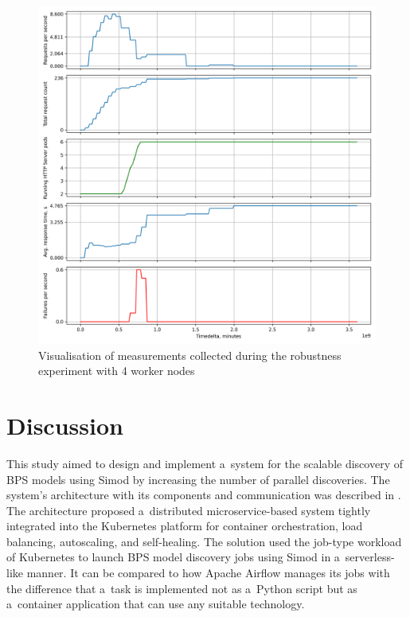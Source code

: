 \documentclass[12pt]{article}
\begin{document}
\begin{figure}[p]
    \centering
    \includegraphics[width=\textwidth]{figures/robustness_4_nodes.png}
    \caption{Visualisation of measurements collected during the robustness experiment with 4 worker nodes}
    \label{fig:robustness_4_nodes}
\end{figure}

\clearpage
\section{Discussion} \label{ch:discussion}

This study aimed to design and implement a~system for the scalable discovery of BPS models using Simod by increasing the number of parallel discoveries. The system's architecture with its components and communication was described in . The architecture proposed a~distributed microservice-based system tightly integrated into the Kubernetes platform for container orchestration, load balancing, autoscaling, and self-healing. The solution used the job-type workload of Kubernetes to launch BPS model discovery jobs using Simod in a~serverless-like manner. It can be compared to how Apache Airflow manages its jobs with the difference that a~task is implemented not as a~Python script but as a~container application that can use any suitable technology.
\end{document}
